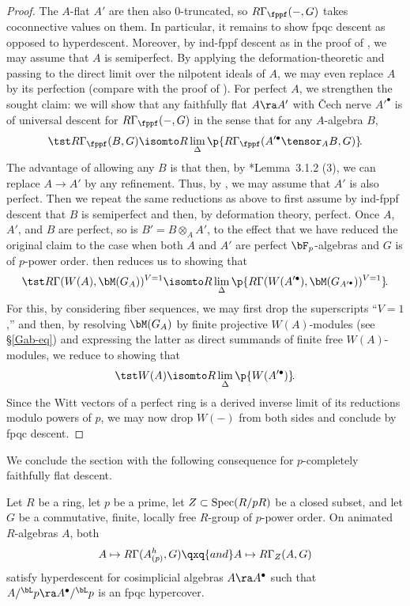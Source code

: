 \begin{proof}
The $A$-flat $A'$ are then also $0$-truncated, so $R\Gamma_\fppf(-, G)$ takes coconnective values on them. In particular, it remains to show fpqc descent as opposed to hyperdescent. %
Moreover, by ind-fppf descent as in the proof of , we may assume that $A$ is semiperfect. By applying the deformation-theoretic  and passing to the direct limit over the nilpotent ideals of $A$, we may even replace $A$ by its perfection (compare with the proof of ).  For perfect $A$, we strengthen the sought claim: we will show that any faithfully flat $A\ra A'$ with  \v{C}ech nerve $A'^\bullet$ is of universal descent for $R\Gamma_\fppf(-, G)$ in the sense that for any $A$-algebra $B$,
\[
\tst R\Gamma_\fppf(B,G) \isomto  R\lim_\Delta \p{R\Gamma_\fppf(A^{\prime\bullet} \tensor_A B,G)}\!.
\]
The advantage of allowing any $B$ is that then, by \cite{LZ17}*{Lemma~3.1.2 (3)}, we can replace $A\to A'$ by any refinement. Thus, by , we may assume that $A'$ is also perfect. Then we repeat the same reductions as above to first assume by ind-fppf descent that $B$ is semiperfect and then, by deformation theory, perfect. Once $A$, $A'$, and $B$ are perfect, so is $B'=B\otimes_A A'$, to the effect that we have reduced the original claim to the case when both $A$ and $A'$ are perfect $\bF_p$-algebras and $G$ is of $p$-power order.  then reduces us to showing that
\[
\tst R\Gamma(W(A),\bM(G_A))^{V = 1} \isomto  R\lim_\Delta \p{R\Gamma(W(A^{\prime\bullet}), \bM(G_{A^{\prime\bullet}}))^{V = 1}}\!.
\]
For this, by considering fiber sequences, we may first drop the superscripts ``$V = 1$,'' and then, by resolving $\bM(G_A)$ by finite projective $W(A)$-modules (see \S\ref{Gab-eq}) and expressing the latter as direct summands of finite free $W(A)$-modules, we reduce to showing that
\[
\tst W(A) \isomto  R\lim_\Delta \p{W(A^{\prime\bullet})}\!.
\]
Since the Witt vectors of a perfect ring is a derived inverse limit of its reductions modulo powers of $p$, we may now drop $W(-)$ from both sides and conclude by fpqc descent.
\end{proof}





We conclude the section with the following consequence for $p$-completely faithfully flat descent.

\begin{corollary}
\notready\label{cor:descentsupport}
Let $R$ be a ring, let $p$ be a prime, let $Z \subset \operatorname{Spec}(R/pR)$ be a closed subset, and let $G$ be a commutative, finite, locally free $R$-group of $p$-power order. On animated $R$-algebras $A$, both
\[
A\mapsto R\Gamma(A^h_{(p)}, G) \qxq{and} A\mapsto R\Gamma_Z(A,G)
\]
satisfy hyperdescent for cosimplicial algebras $A \ra A^\bullet$ such that $A/^\bL p \ra A^\bullet/^\bL p$ is an fpqc hypercover.
\end{corollary}

